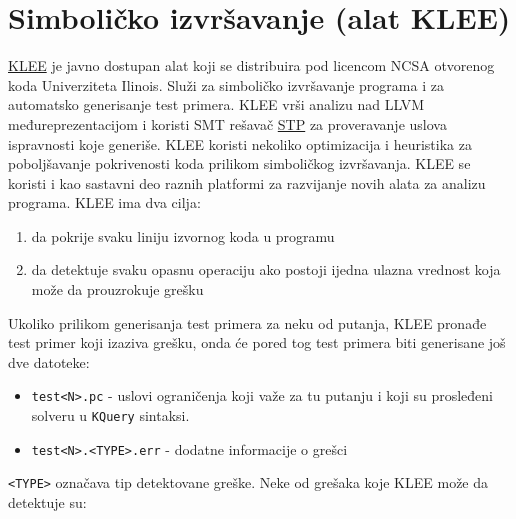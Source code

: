 \section{Simboličko izvršavanje (alat KLEE)}\label{simboliux10dko-izvrux161avanje-alat-klee}

\href{http://klee.github.io/}{KLEE} je javno dostupan alat koji se distribuira pod licencom NCSA otvorenog koda Univerziteta Ilinois. Služi za simboličko izvršavanje programa i za automatsko generisanje test primera. KLEE vrši analizu nad LLVM međureprezentacijom i koristi SMT rešavač \href{https://stp.github.io/}{STP} za proveravanje uslova ispravnosti koje generiše. KLEE koristi nekoliko optimizacija i heuristika za poboljšavanje pokrivenosti koda prilikom simboličkog izvršavanja. KLEE se koristi i kao sastavni deo raznih platformi za razvijanje novih alata za analizu programa. KLEE ima dva cilja:

\begin{enumerate}
\def\labelenumi{\arabic{enumi}.}
\tightlist
\item
  da pokrije svaku liniju izvornog koda u programu
\item
  da detektuje svaku opasnu operaciju ako postoji ijedna ulazna vrednost koja može da prouzrokuje grešku
\end{enumerate}

Ukoliko prilikom generisanja test primera za neku od putanja, KLEE pronađe test primer koji izaziva grešku, onda će pored tog test primera biti generisane još dve datoteke:

\begin{itemize}
\tightlist
\item
  \texttt{test\textless{}N\textgreater{}.pc} - uslovi ograničenja koji važe za tu putanju i koji su prosleđeni solveru u \texttt{KQuery} sintaksi.
\item
  \texttt{test\textless{}N\textgreater{}.\textless{}TYPE\textgreater{}.err} - dodatne informacije o grešci
\end{itemize}

\texttt{\textless{}TYPE\textgreater{}} označava tip detektovane greške. Neke od grešaka koje KLEE može da detektuje su:

